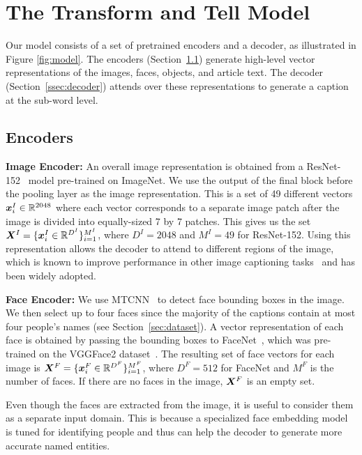 
\section{The Transform and Tell Model}

Our model consists of a set of pretrained encoders and a decoder, as
illustrated in Figure \ref{fig:model}. The encoders
(Section~\ref{ssec:encoder}) generate high-level vector representations of the
images, faces, objects, and article text. The decoder
(Section~\ref{ssec:decoder}) attends over these representations to generate a
caption at the sub-word level.

\subsection{Encoders}
\label{ssec:encoder}

\noindent\textbf{Image Encoder:} An overall image representation is obtained
from a ResNet-152~\cite{He2016ResNet} model pre-trained on ImageNet. We use the
output of the final block before the pooling layer as the image representation.
This is a set of 49 different vectors $\bm{x}^I_{i} \in \mathbb{R}^{2048}$ where
each vector corresponds to a separate image patch after the image is divided
into equally-sized 7 by 7 patches. This gives us the set $\bm{X}^I = \{\bm{x}^I_{i}
\in \mathbb{R}^{D^I}\}_{i=1}^{M^I}$, where $D^I = 2048$ and $M^I = 49$ for
ResNet-152. Using this representation allows the decoder to attend to different
regions of the image, which is known to improve performance in other image
captioning tasks~\cite{Xu2015ShowAA} and has been widely adopted.

\noindent\textbf{Face Encoder:} We use MTCNN~\cite{Zhang2016JointFD} to detect
face bounding boxes in the image. We then select up to four faces since the
majority of the captions contain at most four people's names (see
Section~\ref{sec:dataset}). A vector representation of each face is obtained by
passing the bounding boxes to FaceNet~\cite{Schroff2015FaceNetAU}, which was
pre-trained on the VGGFace2 dataset~\cite{Cao2017VGGFace2AD}. The resulting set
of face vectors for each image is
$\bm{X}^{F} = \{\bm{x}^F_{i} \in \mathbb{R}^{D^F}\}_{i=1}^{M^F}$, where $D^F = 512$ for FaceNet and $M^F$ is the
number of faces. If there are no faces in the image, $\bm{X}^{F}$ is an empty set.

Even though the faces are extracted from the image, it is useful to consider
them as a separate input domain. This is because a specialized face embedding
model is tuned for identifying people and thus can help the
decoder to generate more accurate named entities.


